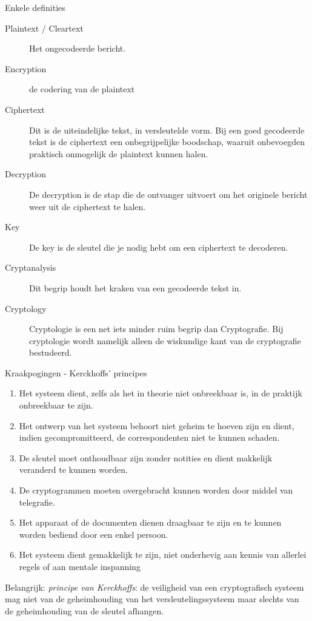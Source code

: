 \documentclass{beamer}
\begin{document}
\begin{frame}{Enkele definities}
	\begin{description}
		\item[Plaintext / Cleartext] Het ongecodeerde bericht. 
			
		\item[Encryption] de codering van de plaintext
		\item[Ciphertext] 
		
		Dit is de uiteindelijke tekst, in versleutelde vorm. Bij een goed gecodeerde tekst is de ciphertext een onbegrijpelijke boodschap, waaruit onbevoegden praktisch onmogelijk de plaintext kunnen halen.
		\item[Decryption] 
		
		De decryption is de stap die de ontvanger uitvoert om het originele bericht weer uit de ciphertext te halen. 
		\item[Key] 
		
		De key is   de sleutel die je nodig hebt om een ciphertext te decoderen. 
		\item[Cryptanalysis] 
		
		Dit begrip houdt het kraken van een gecodeerde tekst in. 
		\item[Cryptology] 
		
		Cryptologie is een net iets minder ruim begrip dan Cryptografie. Bij cryptologie wordt namelijk alleen de wiskundige kant van de cryptografie bestudeerd.
	\end{description}

\end{frame}

\begin{frame}{Kraakpogingen - Kerckhoffs' principes}
	
	\begin{enumerate}
		\item Het systeem dient, zelfs als het in theorie niet onbreekbaar is, in de praktijk onbreekbaar te zijn. \pause
		\item \textcolor{HoGentAccent1}{Het ontwerp van het systeem behoort niet geheim te hoeven zijn en dient, indien gecompromitteerd, de correspondenten niet te kunnen schaden.}\pause
		\item De sleutel moet onthoudbaar zijn zonder notities en dient makkelijk veranderd te kunnen worden.\pause
		\item De cryptogrammen moeten overgebracht kunnen worden door middel van telegrafie.\pause
		\item Het apparaat of de documenten dienen draagbaar te zijn en te kunnen worden bediend door een enkel persoon.\pause
		\item Het systeem dient gemakkelijk te zijn, niet onderhevig aan kennis van allerlei regels of aan mentale inspanning\pause
\end{enumerate}
	\textcolor{HoGentAccent1}{Belangrijk: \textit{principe van Kerckhoffs}}: de veiligheid van een cryptografisch systeem mag niet van de geheimhouding van het versleutelingssysteem maar slechts van de geheimhouding van de sleutel afhangen.

\end{frame}
\end{document}
